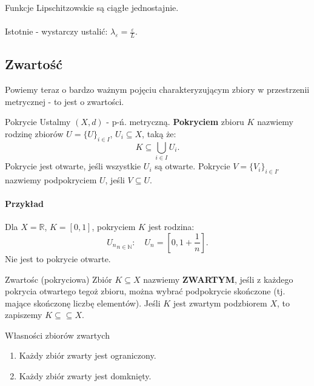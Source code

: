 \documentclass{article}
\numberwithin{defi}{section}
\numberwithin{theo}{section}
\numberwithin{defi}{section}
\newcommand{\R}{\mathbb{R}}
\newcommand{\N}{\mathbb{N}}
\newcommand{\eps}{\varepsilon}
\begin{document}
    \begin{obs}{}
        Funkcje Lipschitzowskie są ciągłe jednostajnie.
    \end{obs}
    \paragraph{} Istotnie - wystarczy ustalić: $\lambda_\eps = \frac{\eps}{L}$.

\subsection{Zwartość}

    Powiemy teraz o bardzo ważnym pojęciu charakteryzującym zbiory w przestrzenii metrycznej - to jest o zwartości.

    \begin{defr}{Pokrycie}
        Ustalmy $(X, d)$ - p-ń. metryczną.
        \textbf{Pokryciem} zbioru $K$ nazwiemy rodzinę zbiorów $U = \{U \}_{i \in I}$, $U_i \subseteq X$, taką że: \begin{equation}
            K \subseteq \bigcup_{i \in I} U_i.
        \end{equation}  Pokrycie jest otwarte, jeśli wszystkie $U_i$ są otwarte.
        Pokrycie $V = \{ V_i \}_{i \in I'}$ nazwiemy podpokryciem $U$, jeśli $V \subseteq U$.
    \end{defr}
    \paragraph{Przykład} Dla $X = \R$, $K = [0, 1]$, pokryciem $K$ jest rodzina: \begin{equation*}
        {U_n}_{n \in \N}: \quad U_n = [0, 1 + \frac{1}{n}].
    \end{equation*} Nie jest to pokrycie otwarte.

    \begin{defr}{Zwartośc (pokryciowa)}\label{defr:zwartosc-pokryciowa}
        Zbiór $K \subseteq X$ nazwiemy \textbf{ZWARTYM}, jeśli z każdego pokrycia otwartego tegoż zbioru, można wybrać podpokrycie skończone (tj. mające skończonę liczbę elementów). Jeśli $K$ jest zwartym podzbiorem $X$, to zapiszemy $K \subseteq \subseteq X$.
    \end{defr}

    \begin{twier}{Własności zbiorów zwartych}
        \begin{enumerate}
            \item Każdy zbiór zwarty jest ograniczony.
            \item Każdy zbiór zwarty jest domknięty.
        \end{enumerate}
    \end{twier}
\end{document}
